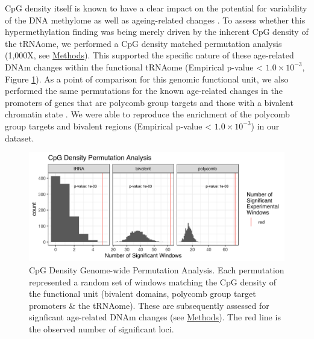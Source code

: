 \documentclass[]{book}
\begin{document}
CpG density itself is known to have a clear impact on the potential for variability of the DNA methylome as well as ageing-related changes \citep{Ziller2013, Christensen2009}.
To assess whether this hypermethylation finding was being merely driven by the inherent CpG density of the tRNAome, we performed a CpG density matched permutation analysis (1,000X, see \protect\hyperlink{AgeErichmentPermutation}{Methods}).
This supported the specific nature of these age-related DNAm changes within the functional tRNAome (Empirical p-value \textless{} \(1.0\times10^{-3}\), Figure \ref{fig:permHists}).
As a point of comparison for this genomic functional unit, we also performed the same permutations for the known age-related changes in the promoters of genes that are polycomb group targets \citep{Teschendorff2010} and those with a bivalent chromatin state \citep{Rakyan2010}.
We were able to reproduce the enrichment of the polycomb group targets and bivalent regions (Empirical p-value \textless{} \(1.0\times10^{-3}\)) in our dataset.

\begin{figure}

{\centering \includegraphics[width=1\linewidth]{figs/tRNA-poly-bivP_n1000_combined_perm_hist} 

}

\caption{CpG Density Genome-wide Permutation Analysis. Each permutation represented a random set of windows matching the CpG density of the functional unit (bivalent domains, polycomb group target promoters \& the tRNAome). These are subsequently assessed for signficant age-related DNAm changes (see \protect\hyperlink{AgeErichmentPermutation}{Methods}). The red line is the observed number of significant loci.}\label{fig:permHists}
\end{figure}
\end{document}
